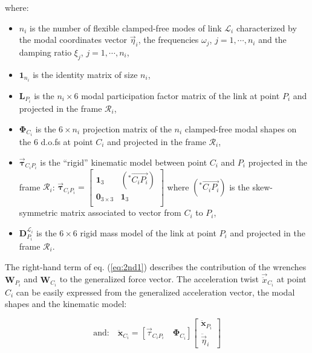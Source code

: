 where:
\begin{itemize}
	\item $n_i$ is the number of flexible clamped-free modes of link $\mathcal{L}_i$ characterized by the  modal coordinates vector $\vec{\eta}_i$, the frequencies $\omega_j$, $j=1,\cdots,n_i$ and the damping ratio $\xi_j$, $j=1,\cdots,n_i$,
	\item $\mathbf{1}_{n_i}$ is the identity matrix of size $n_i$,
	\item $\mathbf{L}_{P_i}$ is the $n_i\times 6$ modal participation factor matrix of the link at point $P_i$ and projected in the frame $\mathcal{R}_i$, 
	\item $\mathbf{\Phi}_{C_i}$ is the  $6\times n_i$ projection matrix of the $n_i$ clamped-free modal shapes on the $6$ d.o.fs at point $C_i$ and projected in the frame $\mathcal{R}_i$,
	\item $\mathbf{\vec{\tau}}_{C_iP_i}$ is the ``rigid'' kinematic model between point $C_i$ and $P_i$ projected in the frame $\mathcal{R}_i$: $\mathbf{\vec{\tau}}_{C_iP_i}=\left[\begin{array}{cc}
	\mathbf{1}_3  & (^*\overrightarrow{C_iP_i})\\
	\mathbf{0}_{3\times 3} & \mathbf{1}_3  \\
	\end{array}\right]$ where $(^*\overrightarrow{C_iP_i})$ is the skew-symmetric matrix associated to vector from $C_i$ to $P_i$,
	\item $\mathbf{D}^{\mathcal{L}_i}_{P_i}$ is the $6 \times 6$  rigid mass model of the link at point $P_i$ and projected in the frame $\mathcal{R}_i$.
\end{itemize}


The right-hand term of eq. (\ref{eq:2nd1}) describes the contribution of the wrenches $\mathbf{W}_{P_i}$ and $\mathbf{W}_{C_i}$ to the generalized force vector. The acceleration twist $\vec{\ddot{x}}_{C_i}$ at point $C_i$ can be easily expressed from the generalized acceleration vector, the modal shapes and the kinematic model:

\begin{small}
	\begin{equation}\label{eq:2ndb}
\mbox{and:}\quad \ddot{\mathbf{x}}_{C_i}=[\vec{\tau}_{C_iP_i}\quad \mathbf{\Phi}_{C_i}]\left[\begin{array}{c}\ddot{\mathbf{x}}_{P_i}\\ \ddot{\vec{\eta}}_i\end{array}\right]
\end{equation}
\end{small}

